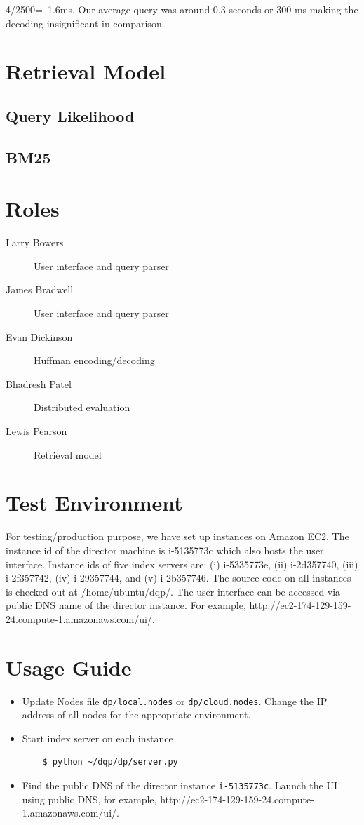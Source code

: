 \documentclass[letterpaper,11pt,twoside]{article}
\begin{document}
4/2500=~1.6ms. Our average query was around 0.3 seconds or 300 ms making the decoding insignificant in comparison.

\section{Retrieval Model}

\subsection{Query Likelihood}

\subsection{BM25}

\section{Roles}
\begin{description}
  \item[Larry Bowers] User interface and query parser
  \item[James Bradwell] User interface and query parser
  \item[Evan Dickinson] Huffman encoding/decoding 
  \item[Bhadresh Patel] Distributed evaluation
  \item[Lewis Pearson] Retrieval model
\end{description}

\section{Test Environment}

For testing/production purpose, we have set up instances on Amazon EC2. The instance id of the director machine is i-5135773c which also hosts the user interface. Instance ids of five index servers are: (i) i-5335773e, (ii) i-2d357740, (iii) i-2f357742, (iv) i-29357744, and (v) i-2b357746. The source code on all instances is checked out at /home/ubuntu/dqp/. The user interface can be accessed via public DNS name of the director instance. For example, http://ec2-174-129-159-24.compute-1.amazonaws.com/ui/.

\section{Usage Guide}

\begin{itemize}
	\item Update Nodes file \texttt{dp/local.nodes} or \texttt{dp/cloud.nodes}. Change the IP address of all nodes for the appropriate environment.
	\item Start index server on each instance
\begin{verbatim}
	$ python ~/dqp/dp/server.py
\end{verbatim}
	\item Find the public DNS of the director instance \texttt{i-5135773c}. Launch the UI using public DNS, for example, http://ec2-174-129-159-24.compute-1.amazonaws.com/ui/.
\end{itemize}
\end{document}
